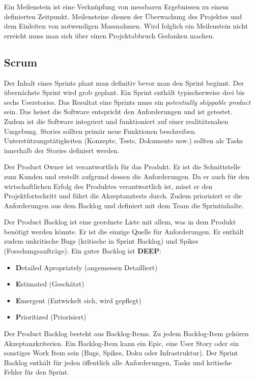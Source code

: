 Ein Meilenstein ist eine Verknüpfung von messbaren Ergebnissen zu einem definierten Zeitpunkt. Meilensteine dienen der Überwachung des Projektes und dem Einleiten von notwendigen Massnahmen. Wird folglich ein Meilenstein nicht erreicht muss man sich über einen Projektabbruch Gedanken machen.

\subsection{Scrum}

Der Inhalt eines Sprints plant man definitiv bevor man den Sprint beginnt. Der übernächste Sprint wird grob geplant. Ein Sprint enthält typischerweise drei bis sechs Userstories. Das Resultat eine Sprints muss ein \emph{potentially shippable product} sein. Das heisst die Software entspricht den Anforderungen und ist getestet. Zudem ist die Software integriert und funktioniert auf einer realitätsnahen Umgebung. Stories sollten primär neue Funktionen beschreiben. Unterstützungstätigkeiten (Konzepte, Tests, Dokumente usw.) sollten als Tasks innerhalb der Stories definiert werden.

Der Product Owner ist verantwortlich für das Produkt. Er ist die Schnittstelle zum Kunden und erstellt aufgrund dessen die Anforderungen. Da er auch für den wirtschaftlichen Erfolg des Produktes verantwortlich ist, misst er den Projektfortschritt und führt die Akzeptanztests durch. Zudem priorisiert er die Anforderungen aus dem Backlog und definiert mit dem Team die Sprintinhalte.

Der Product Backlog ist eine geordnete Liste mit allem, was in dem Produkt benötigt werden könnte. Er ist die einzige Quelle für Anforderungen. Er enthält zudem unkritische Bugs (kritische in Sprint Backlog) und Spikes (Forschungsaufträge). Ein guter Backlog ist \textbf{DEEP}:
\begin{itemize}
	\item \textbf{D}etailed Apropriately (angemessen Detailliert)
	\item \textbf{E}stimated (Geschätzt)
	\item \textbf{E}mergent (Entwickelt sich, wird gepflegt)
	\item \textbf{P}rioritized (Priorisiert)
\end{itemize}
Der Product Backlog besteht aus Backlog-Items. Zu jedem Backlog-Item gehören Akzeptanzkriterien. Ein Backlog-Item kann ein Epic, eine User Story oder ein sonstiges Work Item sein (Bugs, Spikes, Doku oder Infrastruktur). Der Sprint Backlog enthält für jeden öffentlich alle Anforderungen, Tasks und kritische Fehler für den Sprint.

